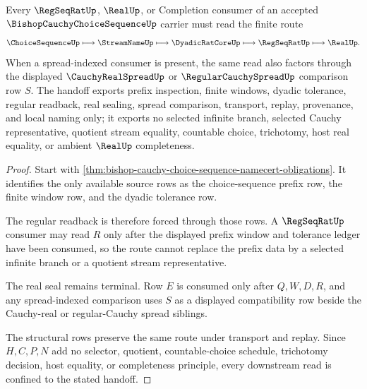 \begin{theorem}
\label{thm:bishop-cauchy-choice-sequence-regseqrat-real-handoff}
Every $\RegSeqRatUp$, $\RealUp$, or Completion consumer of an accepted $\BishopCauchyChoiceSequenceUp$ carrier must read the finite route
$$
\ChoiceSequenceUp \longmapsto \StreamNameUp \longmapsto \DyadicRatCoreUp \longmapsto \RegSeqRatUp \longmapsto \RealUp .
$$
When a spread-indexed consumer is present, the same read also factors through the displayed $\CauchyRealSpreadUp$ or $\RegularCauchySpreadUp$ comparison row $S$. The handoff exports prefix inspection, finite windows, dyadic tolerance, regular readback, real sealing, spread comparison, transport, replay, provenance, and local naming only; it exports no selected infinite branch, selected Cauchy representative, quotient stream equality, countable choice, trichotomy, host real equality, or ambient $\RealUp$ completeness.
\end{theorem}
\begin{proof}
Start with \autoref{thm:bishop-cauchy-choice-sequence-namecert-obligations}. It identifies the only available source rows as the choice-sequence prefix row, the finite window row, and the dyadic tolerance row.

The regular readback is therefore forced through those rows. A $\RegSeqRatUp$ consumer may read $R$ only after the displayed prefix window and tolerance ledger have been consumed, so the route cannot replace the prefix data by a selected infinite branch or a quotient stream representative.

The real seal remains terminal. Row $E$ is consumed only after $Q,W,D,R$, and any spread-indexed comparison uses $S$ as a displayed compatibility row beside the Cauchy-real or regular-Cauchy spread siblings.

The structural rows preserve the same route under transport and replay. Since $H,C,P,N$ add no selector, quotient, countable-choice schedule, trichotomy decision, host equality, or completeness principle, every downstream read is confined to the stated handoff.
\end{proof}


